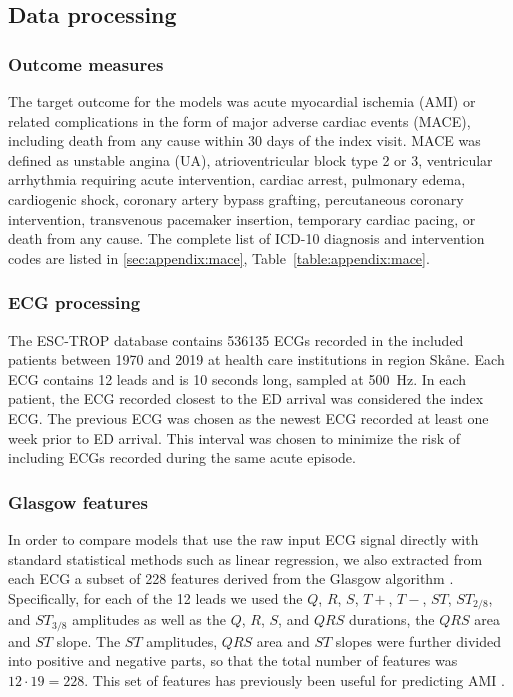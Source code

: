 \documentclass[preprint]{elsarticle}
\begin{document}
\subsection{Data processing}
\subsubsection{Outcome measures}
The target outcome for the models was acute myocardial ischemia (AMI) or related complications in the form of major adverse cardiac events (MACE), including death from any cause within 30 days of the index visit. MACE was defined as unstable angina (UA), atrioventricular block type 2 or 3, ventricular arrhythmia requiring acute intervention, cardiac arrest, pulmonary edema, cardiogenic shock, coronary artery bypass grafting, percutaneous coronary intervention, transvenous pacemaker insertion, temporary cardiac pacing, or death from any cause. The complete list of ICD-10 diagnosis and intervention codes are listed in \ref{sec:appendix:mace}, Table~\ref{table:appendix:mace}.

\subsubsection{ECG processing}
The ESC-TROP database contains 536135 ECGs recorded in the included patients between 1970 and 2019 at health care institutions in region Sk\aa{}ne. Each ECG contains 12 leads and is 10 seconds long, sampled at \SI{500}{\hertz}. In each patient, the ECG recorded closest to the ED arrival was considered the index ECG. The previous ECG was chosen as the newest ECG recorded at least one week prior to ED arrival. This interval was chosen to minimize the risk of including ECGs recorded during the same acute episode.

\subsubsection{Glasgow features}
In order to compare models that use the raw input ECG signal directly with standard statistical methods such as linear regression, we also extracted from each ECG a subset of 228 features derived from the Glasgow algorithm \citep{macfarlane2005}. Specifically, for each of the 12 leads we used the $Q$, $R$, $S$, $T+$, $T-$, $ST$, $ST_{2/8}$, and $ST_{3/8}$ amplitudes as well as the $Q$, $R$, $S$, and $QRS$ durations, the $QRS$ area and $ST$ slope. The $ST$ amplitudes, $QRS$ area and $ST$ slopes were further divided into positive and negative parts, so that the total number of features was $12 \cdot 19=228$. This set of features has previously been useful for predicting AMI \citep{forberg2009}.
\end{document}
